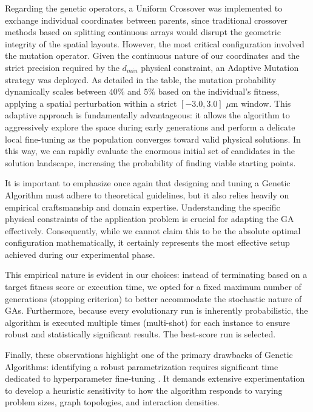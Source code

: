 Regarding the genetic operators, a Uniform Crossover was implemented to exchange individual coordinates between parents, since traditional crossover methods based on splitting continuous arrays would disrupt the geometric integrity of the spatial layouts. However, the most critical configuration involved the mutation operator. Given the continuous nature of our coordinates and the strict precision required by the $d_{min}$ physical constraint, an Adaptive Mutation strategy was deployed. As detailed in the table, the mutation probability dynamically scales between $40\%$ and $5\%$ based on the individual's fitness, applying a spatial perturbation within a strict $[-3.0, 3.0]$ $\mu$m window. This adaptive approach is fundamentally advantageous: it allows the algorithm to aggressively explore the space during early generations and perform a delicate local fine-tuning as the population converges toward valid physical solutions. In this way, we can rapidly evaluate the enormous initial set of candidates in the solution landscape, increasing the probability of finding viable starting points.

It is important to emphasize once again that designing and tuning a Genetic Algorithm must adhere to theoretical guidelines, but it also relies heavily on empirical craftsmanship and domain expertise. Understanding the specific physical constraints of the application problem is crucial for adapting the GA effectively. Consequently, while we cannot claim this to be the absolute optimal configuration mathematically, it certainly represents the most effective setup achieved during our experimental phase. 

This empirical nature is evident in our choices: instead of terminating based on a target fitness score or execution time, we opted for a fixed maximum number of generations (stopping criterion) to better accommodate the stochastic nature of GAs. Furthermore, because every evolutionary run is inherently probabilistic, the algorithm is executed multiple times (multi-shot) for each instance to ensure robust and statistically significant results. The best-score run is selected.

Finally, these observations highlight one of the primary drawbacks of Genetic Algorithms: identifying a robust parametrization requires significant time dedicated to hyperparameter fine-tuning \cite{bookGA}. It demands extensive experimentation to develop a heuristic sensitivity to how the algorithm responds to varying problem sizes, graph topologies, and interaction densities.

